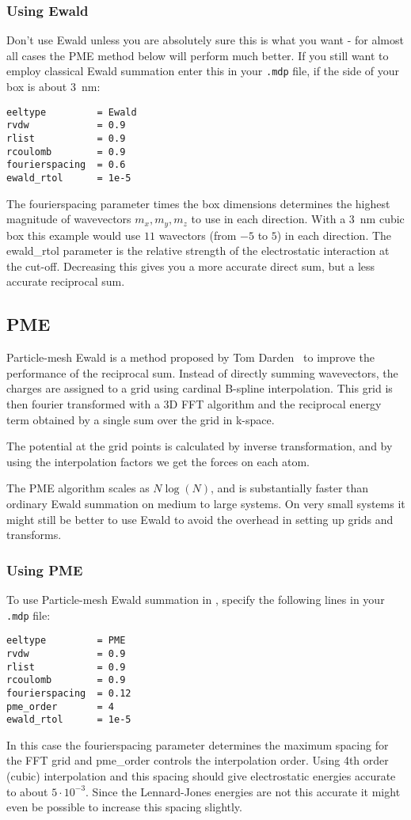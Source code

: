 \subsubsection{Using Ewald}
Don't use Ewald unless you are absolutely sure this is what you want - 
for almost all cases the PME method below will perform much better. 
If you still want to employ classical Ewald summation enter this in
your {\tt .mdp} file, if the side of your box is about $3$~nm:
\begin{verbatim}
eeltype         = Ewald
rvdw            = 0.9
rlist           = 0.9
rcoulomb        = 0.9
fourierspacing  = 0.6
ewald_rtol      = 1e-5
\end{verbatim}
The fourierspacing parameter times the box dimensions 
determines the highest magnitude of wavevectors
$m_x,m_y,m_z$ to use in each direction. With a 3~nm cubic box this example
would use $11$ wavectors (from $-5$ to $5$) in each direction.
The ewald\_rtol parameter is the relative
strength of the electrostatic interaction at the cut-off. Decreasing
this gives you a more accurate direct sum, but a less accurate
reciprocal sum. 
 
\subsection{PME}
\label{sec:pme}
Particle-mesh Ewald is a method proposed by Tom
Darden~\cite{Darden93,Essmann95} to improve the performance of the
reciprocal sum. Instead of directly summing wavevectors, the charges
are assigned to a grid using cardinal B-spline interpolation. This
grid is then fourier transformed with a 3D FFT algorithm and 
the reciprocal energy term obtained by a single sum over the grid in k-space.

The potential at the grid points is calculated by inverse
transformation, and by using the interpolation factors we get the
forces on each atom. 

The PME algorithm scales as $N \log(N)$, and is substantially faster
than ordinary Ewald summation on medium to large systems. On very
small systems it might still be better to use Ewald to avoid the
overhead in setting up grids and transforms.

\subsubsection{Using PME}
To use Particle-mesh Ewald summation in {\gromacs}, specify the
following lines in your {\tt .mdp} file:
\begin{verbatim}
eeltype         = PME
rvdw            = 0.9
rlist           = 0.9
rcoulomb        = 0.9
fourierspacing  = 0.12
pme_order       = 4
ewald_rtol      = 1e-5
\end{verbatim}
In this case the fourierspacing parameter determines the maximum spacing for the
FFT grid and pme\_order controls the interpolation
order. Using 4th order (cubic) interpolation and this spacing 
should give electrostatic energies accurate to about $5\cdot10^{-3}$. Since
the Lennard-Jones energies are not this accurate it might even be possible 
to increase this spacing slightly.

